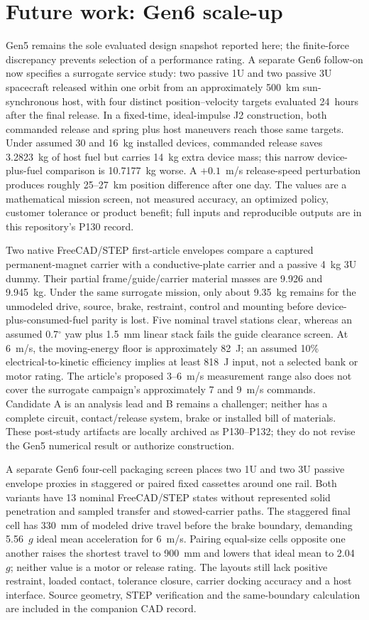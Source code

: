 \documentclass[conference]{IEEEtran}
\begin{document}
\section{Future work: Gen6 scale-up}\label{sec:future}
Gen5 remains the sole evaluated design snapshot reported here; the finite-force discrepancy prevents selection of a performance rating. A separate Gen6 follow-on now specifies a surrogate service study: two passive 1U and two passive 3U spacecraft released within one orbit from an approximately 500~km sun-synchronous host, with four distinct position--velocity targets evaluated 24~hours after the final release. In a fixed-time, ideal-impulse J2 construction, both commanded release and spring plus host maneuvers reach those same targets. Under assumed 30 and 16~kg installed devices, commanded release saves 3.2823~kg of host fuel but carries 14~kg extra device mass; this narrow device-plus-fuel comparison is 10.7177~kg worse. A $+0.1$~m/s release-speed perturbation produces roughly 25--27~km position difference after one day. The values are a mathematical mission screen, not measured accuracy, an optimized policy, customer tolerance or product benefit; full inputs and reproducible outputs are in this repository's P130 record.

Two native FreeCAD/STEP first-article envelopes compare a captured permanent-magnet carrier with a conductive-plate carrier and a passive 4~kg 3U dummy. Their partial frame/guide/carrier material masses are 9.926 and 9.945~kg. Under the same surrogate mission, only about 9.35~kg remains for the unmodeled drive, source, brake, restraint, control and mounting before device-plus-consumed-fuel parity is lost. Five nominal travel stations clear, whereas an assumed 0.7$^{\circ}$ yaw plus 1.5~mm linear stack fails the guide clearance screen. At 6~m/s, the moving-energy floor is approximately 82~J; an assumed 10\% electrical-to-kinetic efficiency implies at least 818~J input, not a selected bank or motor rating. The article's proposed 3--6~m/s measurement range also does not cover the surrogate campaign's approximately 7 and 9~m/s commands. Candidate A is an analysis lead and B remains a challenger; neither has a complete circuit, contact/release system, brake or installed bill of materials. These post-study artifacts are locally archived as P130--P132; they do not revise the Gen5 numerical result or authorize construction.

A separate Gen6 four-cell packaging screen places two 1U and two 3U passive envelope proxies in staggered or paired fixed cassettes around one rail. Both variants have 13 nominal FreeCAD/STEP states without represented solid penetration and sampled transfer and stowed-carrier paths. The staggered final cell has 330~mm of modeled drive travel before the brake boundary, demanding 5.56~$g$ ideal mean acceleration for 6~m/s. Pairing equal-size cells opposite one another raises the shortest travel to 900~mm and lowers that ideal mean to 2.04~$g$; neither value is a motor or release rating. The layouts still lack positive restraint, loaded contact, tolerance closure, carrier docking accuracy and a host interface. Source geometry, STEP verification and the same-boundary calculation are included in the companion CAD record.
\end{document}
